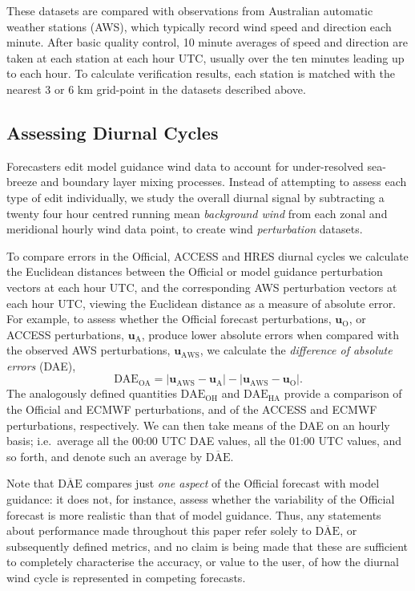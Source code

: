 \documentclass[twocol]{ametsoc}
\begin{document}
These datasets are compared with observations from Australian automatic weather stations (AWS), which typically record wind speed and direction each minute. After basic quality control, 10 minute averages of speed and direction are taken at each station at each hour UTC, usually over the ten minutes leading up to each hour. To calculate verification results, each station is matched with the nearest 3 or 6 km grid-point in the datasets described above.

\subsection{Assessing Diurnal Cycles}
Forecasters edit model guidance wind data to account for under-resolved sea-breeze and boundary layer mixing processes. Instead of attempting to assess each type of edit individually, we study the overall diurnal signal by subtracting a twenty four hour centred running mean \textit{background wind} from each zonal and meridional hourly wind data point, to create wind \emph{perturbation} datasets. 

To compare errors in the Official, ACCESS and HRES diurnal cycles we calculate the Euclidean distances between the Official or model guidance perturbation vectors at each hour UTC, and the corresponding AWS perturbation vectors at each hour UTC, viewing the Euclidean distance as a measure of absolute error. For example, to assess whether the Official forecast perturbations, $\boldsymbol{u}_{\text{O}}$, or ACCESS perturbations, $\boldsymbol{u}_{\text{A}}$, produce lower absolute errors when compared with the observed AWS perturbations, $\boldsymbol{u}_{\text{AWS}}$, we calculate the \textit{difference of absolute errors} (DAE), 
\begin{equation}
\text{DAE}_\text{OA} = \left\lvert \boldsymbol{u}_{\text{AWS}}-\boldsymbol{u}_{\text{A}} \right\rvert - \left\lvert \boldsymbol{u}_{\text{AWS}}-\boldsymbol{u}_{\text{O}} \right\rvert. \label{Eq:DAE}
\end{equation} 
The analogously defined quantities $\text{DAE}_\text{OH}$ and $\text{DAE}_\text{HA}$ provide a comparison of the Official and ECMWF perturbations, and of the ACCESS and ECMWF perturbations, respectively. We can then take means of the DAE on an hourly basis; i.e.~average all the 00:00 UTC DAE values,  all the 01:00 UTC values, and so forth, and denote such an average by $\overline{\text{DAE}}$. 

Note that $\overline{\text{DAE}}$ compares just \textit{one aspect} of the Official forecast with model guidance: it does not, for instance, assess whether the variability of the Official forecast is more realistic than that of model guidance. Thus, any statements about performance made throughout this paper refer solely to $\overline{\text{DAE}}$, or subsequently defined metrics, and no claim is being made that these are sufficient to completely characterise the accuracy, or value to the user, of how the diurnal wind cycle is represented in competing forecasts.
\end{document}

